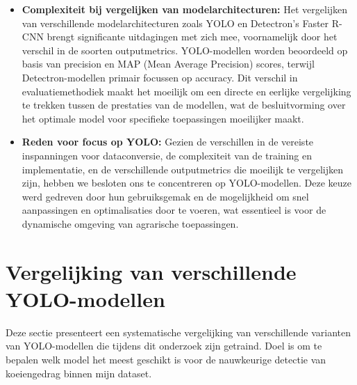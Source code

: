 \begin{itemize}
\begin{itemize}
  \end{itemize}
  \item \textbf{Complexiteit bij vergelijken van modelarchitecturen:} Het vergelijken van verschillende modelarchitecturen zoals YOLO en Detectron's Faster R-CNN brengt significante uitdagingen met zich mee, voornamelijk door het verschil in de soorten outputmetrics. YOLO-modellen worden beoordeeld op basis van precision en MAP (Mean Average Precision) scores, terwijl Detectron-modellen primair focussen op accuracy. Dit verschil in evaluatiemethodiek maakt het moeilijk om een directe en eerlijke vergelijking te trekken tussen de prestaties van de modellen, wat de besluitvorming over het optimale model voor specifieke toepassingen moeilijker maakt.
  \item \textbf{Reden voor focus op YOLO:} Gezien de verschillen in de vereiste inspanningen voor dataconversie, de complexiteit van de training en implementatie, en de verschillende outputmetrics die moeilijk te vergelijken zijn, hebben we besloten ons te concentreren op YOLO-modellen. Deze keuze werd gedreven door hun gebruiksgemak en de mogelijkheid om snel aanpassingen en optimalisaties door te voeren, wat essentieel is voor de dynamische omgeving van agrarische toepassingen.
\end{itemize}
\section{Vergelijking van verschillende YOLO-modellen}
Deze sectie presenteert een systematische vergelijking van verschillende varianten van YOLO-modellen die tijdens dit onderzoek zijn getraind. Doel is om te bepalen welk model het meest geschikt is voor de nauwkeurige detectie van koeiengedrag binnen mijn dataset.
